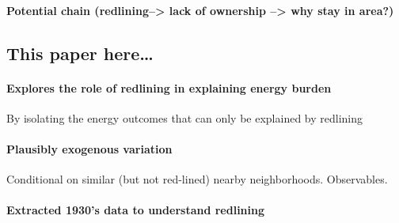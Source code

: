 \documentclass[
]{article}
\begin{document}
\hypertarget{potential-chain-redlining-lack-of-ownership-why-stay-in-area}{%
\paragraph{Potential chain (redlining--\textgreater{} lack of ownership
--\textgreater{} why stay in
area?)}\label{potential-chain-redlining-lack-of-ownership-why-stay-in-area}}

\hypertarget{this-paper-here}{%
\subsection{This paper here\ldots{}}\label{this-paper-here}}

\hypertarget{explores-the-role-of-redlining-in-explaining-energy-burden}{%
\paragraph{Explores the role of redlining in explaining energy
burden}\label{explores-the-role-of-redlining-in-explaining-energy-burden}}

By isolating the energy outcomes that can only be explained by redlining

\hypertarget{plausibly-exogenous-variation}{%
\paragraph{Plausibly exogenous
variation}\label{plausibly-exogenous-variation}}

Conditional on similar (but not red-lined) nearby neighborhoods.
Observables.

\hypertarget{extracted-1930s-data-to-understand-redlining}{%
\paragraph{Extracted 1930's data to understand
redlining}\label{extracted-1930s-data-to-understand-redlining}}
\end{document}
